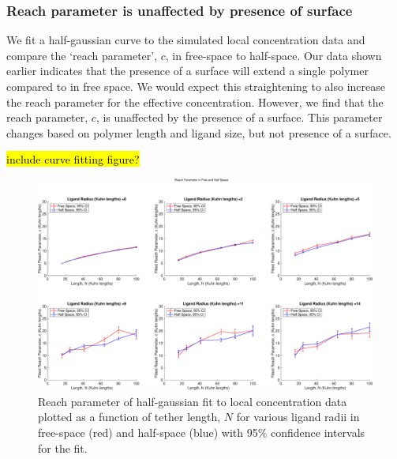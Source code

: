 \documentclass[../../AdvancementSummary.tex]{subfiles}
\begin{document}
\subsubsection{Reach parameter is unaffected by presence of surface}

We fit a half-gaussian curve to the simulated local concentration data and compare the `reach parameter', $c$, in free-space to half-space. Our data shown earlier indicates that the presence of a surface will extend a single polymer compared to in free space. We would expect this straightening to also increase the reach parameter for the effective concentration. However, we find that the reach parameter, $c$, is unaffected by the presence of a surface. This parameter changes based on polymer length and ligand size, but not presence of a surface. 

\hl{include curve fitting figure?}

\begin{figure}[H]
    \begin{center}
        		\includegraphics[width=\linewidth]{ResultsFigures/ReachSurfaceFactor/ReachParameterFreeHalfAxisEqual.eps}
        \caption{Reach parameter of half-gaussian fit to local concentration data plotted as a function of tether length, $N$ for various ligand radii in free-space (red) and half-space (blue) with 95\% confidence intervals for the fit. \label{fig: ReachParameter}}
    \end{center}
\end{figure}
\end{document}
